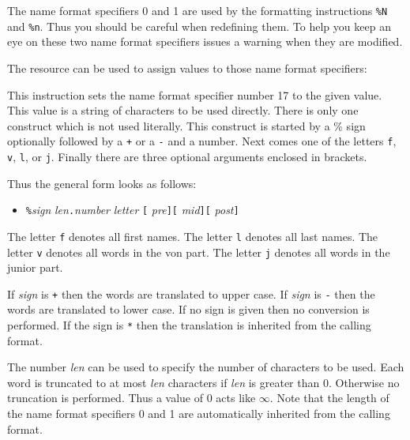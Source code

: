 \documentclass[11pt,a4paper]{scrbook}
\begin{document}
The name format specifiers 0 and 1 are used by the formatting instructions
\verb|%N| and \verb|%n|. Thus you should be careful
when redefining them. To help you keep an eye on these two name format
specifiers \BibTool{} issues a warning when they are modified.

The resource  can be used to assign values to those name
format specifiers:

\begin{Resources}
\end{Resources}

This instruction sets the name format specifier number 17 to the given value.
This value is a string of characters to be used directly. There is only one
construct which is not used literally. This construct is started by a \% sign
optionally followed by a \verb|+| or a \verb|-| and a number. Next comes one
of the letters \texttt{f}, \texttt{v},
\texttt{l}, or \texttt{j}. Finally there are three
optional arguments enclosed in brackets.

Thus the general form looks as follows:

\begin{itemize}
  \item [] \texttt{\%}\textit{sign} \textit{len}\texttt{.}\textit{number}
           \textit{letter} \texttt{[}%
           \textit{pre}\texttt{][}%
           \textit{mid}\texttt{][}%
           \textit{post}\texttt{]} 
\end{itemize}

The letter \texttt{f} denotes all first names.  The letter
\texttt{l} denotes all last names.  The letter
\texttt{v} denotes all words in the von part.  The letter
\texttt{j} denotes all words in the junior part.

If \textit{sign} is \verb|+| then the words are translated to upper case.  If
\textit{sign} is \verb|-| then the words are translated to lower case.  If no
sign is given then no conversion is performed. If the sign is \verb|*| then
the translation is inherited from the calling format.

The number \textit{len} can be used to specify the number of characters to be
used. Each word is truncated to at most \textit{len} characters if
\textit{len} is greater than 0. Otherwise no truncation is performed. Thus a
value of \(0\) acts like \(\infty\). Note that the length of the name format
specifiers 0 and 1 are automatically inherited from the calling format.
\end{document}
